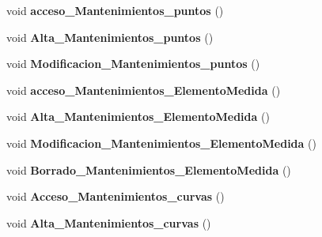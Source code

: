 \begin{DoxyCompactItemize}
\item 
void {\bfseries acceso\+\_\+\+Mantenimientos\+\_\+puntos} ()\hypertarget{class_sica_segura_1_1_s_i_c_a___log_aa2cdb2a9b132b38b08189d65f66b2fde}{}\label{class_sica_segura_1_1_s_i_c_a___log_aa2cdb2a9b132b38b08189d65f66b2fde}

\item 
void {\bfseries Alta\+\_\+\+Mantenimientos\+\_\+puntos} ()\hypertarget{class_sica_segura_1_1_s_i_c_a___log_ac6ae4dbf27bb374d29b4e1e5fa6015e8}{}\label{class_sica_segura_1_1_s_i_c_a___log_ac6ae4dbf27bb374d29b4e1e5fa6015e8}

\item 
void {\bfseries Modificacion\+\_\+\+Mantenimientos\+\_\+puntos} ()\hypertarget{class_sica_segura_1_1_s_i_c_a___log_a6c4c8ee804e21b0b0f77fea076bfb0af}{}\label{class_sica_segura_1_1_s_i_c_a___log_a6c4c8ee804e21b0b0f77fea076bfb0af}

\item 
void {\bfseries acceso\+\_\+\+Mantenimientos\+\_\+\+Elemento\+Medida} ()\hypertarget{class_sica_segura_1_1_s_i_c_a___log_a6a665e9347903784a427aca1d1318d90}{}\label{class_sica_segura_1_1_s_i_c_a___log_a6a665e9347903784a427aca1d1318d90}

\item 
void {\bfseries Alta\+\_\+\+Mantenimientos\+\_\+\+Elemento\+Medida} ()\hypertarget{class_sica_segura_1_1_s_i_c_a___log_a4c1d1bde96fee0c24cd612cd3d2e8d4e}{}\label{class_sica_segura_1_1_s_i_c_a___log_a4c1d1bde96fee0c24cd612cd3d2e8d4e}

\item 
void {\bfseries Modificacion\+\_\+\+Mantenimientos\+\_\+\+Elemento\+Medida} ()\hypertarget{class_sica_segura_1_1_s_i_c_a___log_a3f0634dc6e01b9aa35f33268650fd56d}{}\label{class_sica_segura_1_1_s_i_c_a___log_a3f0634dc6e01b9aa35f33268650fd56d}

\item 
void {\bfseries Borrado\+\_\+\+Mantenimientos\+\_\+\+Elemento\+Medida} ()\hypertarget{class_sica_segura_1_1_s_i_c_a___log_aba62e16c4d4d2bdb89d2468e4f649dfd}{}\label{class_sica_segura_1_1_s_i_c_a___log_aba62e16c4d4d2bdb89d2468e4f649dfd}

\item 
void {\bfseries Acceso\+\_\+\+Mantenimientos\+\_\+curvas} ()\hypertarget{class_sica_segura_1_1_s_i_c_a___log_a5676b014ff43688bf63640717b175e2f}{}\label{class_sica_segura_1_1_s_i_c_a___log_a5676b014ff43688bf63640717b175e2f}

\item 
void {\bfseries Alta\+\_\+\+Mantenimientos\+\_\+curvas} ()\hypertarget{class_sica_segura_1_1_s_i_c_a___log_a63d22418c1159aae360a1c2e9f1068c2}{}\label{class_sica_segura_1_1_s_i_c_a___log_a63d22418c1159aae360a1c2e9f1068c2}


\end{DoxyCompactItemize}
